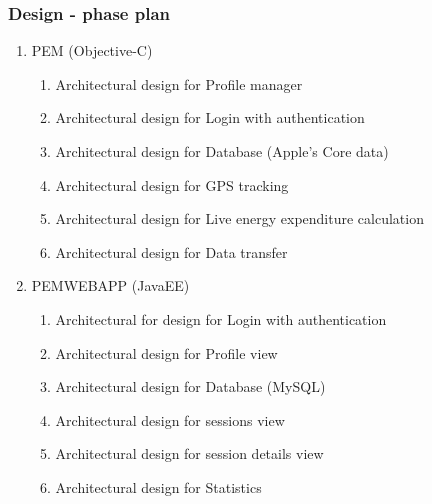 \documentclass[12pt, a4paper]{report}   %
\begin{document}
\subsubsection{Design - phase plan}
\begin{enumerate}
	\item PEM (Objective-C)
		\begin{enumerate}
			\item Architectural design for Profile manager
			\item Architectural design for Login with authentication
			\item Architectural design for Database (Apple's Core data)
			\item Architectural design for GPS tracking
			\item Architectural design for Live energy expenditure calculation
			\item Architectural design for Data transfer
		\end{enumerate}
	\item PEMWEBAPP (JavaEE)
		\begin{enumerate}
			\item Architectural for design for Login with authentication
			\item Architectural design for Profile view
			\item Architectural design for Database (MySQL)
			\item Architectural design for sessions view
			\item Architectural design for session details view
			\item Architectural design for Statistics

		\end{enumerate}

\end{enumerate}


\end{document}
